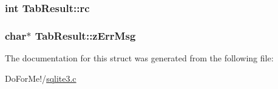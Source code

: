 \hypertarget{struct_tab_result_a44bb015ce660ed3f987e324919d73f4d}{
\subsubsection[{rc}]{\setlength{\rightskip}{0pt plus 5cm}int Tab\-Result\-::rc}}\label{struct_tab_result_a44bb015ce660ed3f987e324919d73f4d}
\hypertarget{struct_tab_result_a6e7104bb622be05f16b6470dbb68a6c7}{
\subsubsection[{z\-Err\-Msg}]{\setlength{\rightskip}{0pt plus 5cm}char$\ast$ Tab\-Result\-::z\-Err\-Msg}}\label{struct_tab_result_a6e7104bb622be05f16b6470dbb68a6c7}


The documentation for this struct was generated from the following file\-:\begin{DoxyCompactItemize}
\item 
Do\-For\-Me!/\hyperlink{sqlite3_8c}{sqlite3.\-c}\end{DoxyCompactItemize}
